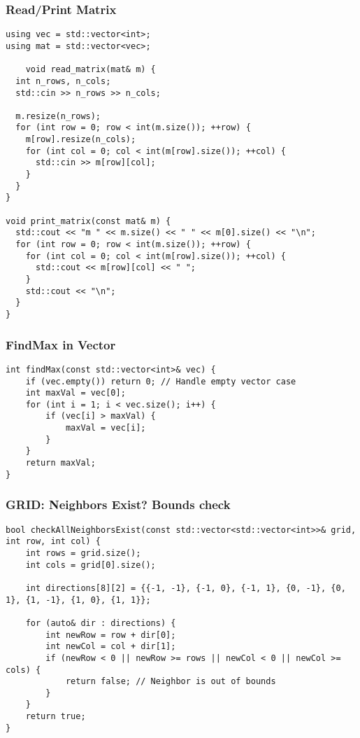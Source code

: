 \subsubsection{Read/Print Matrix}
\begin{lstlisting}[style = codeexpert]
using vec = std::vector<int>;
using mat = std::vector<vec>;

    void read_matrix(mat& m) {
  int n_rows, n_cols;
  std::cin >> n_rows >> n_cols;

  m.resize(n_rows);
  for (int row = 0; row < int(m.size()); ++row) {
    m[row].resize(n_cols);
    for (int col = 0; col < int(m[row].size()); ++col) {
      std::cin >> m[row][col];
    }
  }
}

void print_matrix(const mat& m) {
  std::cout << "m " << m.size() << " " << m[0].size() << "\n";
  for (int row = 0; row < int(m.size()); ++row) {
    for (int col = 0; col < int(m[row].size()); ++col) {
      std::cout << m[row][col] << " ";
    }
    std::cout << "\n";
  }
}
\end{lstlisting}






\subsubsection{FindMax in Vector}
\begin{lstlisting}[style = codeexpert]
int findMax(const std::vector<int>& vec) {
    if (vec.empty()) return 0; // Handle empty vector case
    int maxVal = vec[0];
    for (int i = 1; i < vec.size(); i++) {
        if (vec[i] > maxVal) {
            maxVal = vec[i];
        }
    }
    return maxVal;
}
\end{lstlisting}


\subsubsection{GRID: Neighbors Exist? Bounds check}
\begin{lstlisting}[style = codeexpert]
bool checkAllNeighborsExist(const std::vector<std::vector<int>>& grid, int row, int col) {
    int rows = grid.size();
    int cols = grid[0].size();
    
    int directions[8][2] = {{-1, -1}, {-1, 0}, {-1, 1}, {0, -1}, {0, 1}, {1, -1}, {1, 0}, {1, 1}};
    
    for (auto& dir : directions) {
        int newRow = row + dir[0];
        int newCol = col + dir[1];
        if (newRow < 0 || newRow >= rows || newCol < 0 || newCol >= cols) {
            return false; // Neighbor is out of bounds
        }
    }
    return true;
}
\end{lstlisting}

